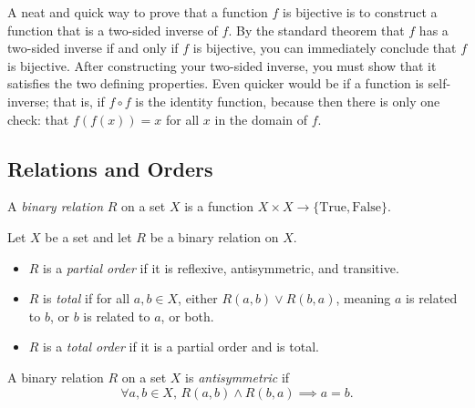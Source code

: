 \documentclass[../ium.tex]{subfiles}
\begin{document}
\begin{remark}
A neat and quick way to prove that a function $f$ is bijective is to construct a function that is a two-sided inverse of $f$. By the standard theorem that $f$ has a two-sided inverse if and only if $f$ is bijective, you can immediately conclude that $f$ is bijective. After constructing your two-sided inverse, you must show that it satisfies the two defining properties. Even quicker would be if a function is self-inverse; that is, if $f \circ f$ is the identity function, because then there is only one check: that $f(f(x)) = x$ for all $x$ in the domain of $f$.
\end{remark}

\subsection*{Relations and Orders}

\begin{definition}
\begin{shaded*}
A \textit{binary relation} $R$ on a set $X$ is a function $X \times X \to \{\mathrm{True}, \mathrm{False}\}$.
\end{shaded*}
\end{definition}

\begin{definition}
\begin{shaded*}
Let $X$ be a set and let $R$ be a binary relation on $X$.
\begin{itemize}
    \item $R$ is a \textit{partial order} if it is reflexive, antisymmetric, and transitive.
    \item $R$ is \textit{total} if for all $a, b \in X$, either $R(a, b) \lor R(b, a)$, meaning $a$ is related to $b$, or $b$ is related to $a$, or both.
    \item $R$ is a \textit{total order} if it is a partial order and is total.
\end{itemize}
\end{shaded*}
\end{definition}

\begin{definition}
\begin{shaded*}
A binary relation $R$ on a set $X$ is \textit{antisymmetric} if
\[
\forall a, b \in X, \, R(a, b) \land R(b, a) \implies a = b.
\]
\end{shaded*}
\end{definition}
\end{document}
